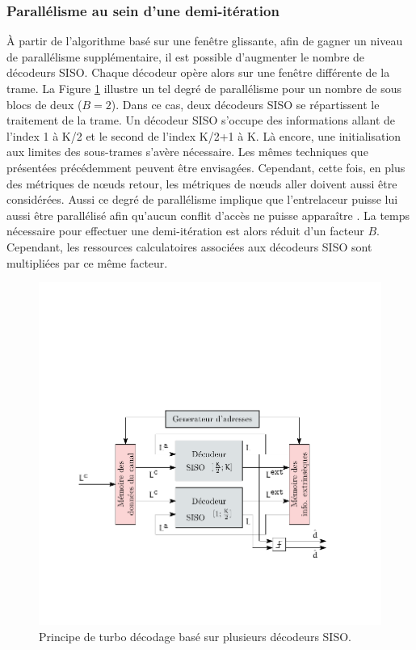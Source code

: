 \subsubsection{Parallélisme au sein d'une demi-itération}
À partir de l'algorithme basé sur une fenêtre glissante, afin de gagner un niveau de parallélisme supplémentaire, il est possible 
d'augmenter le nombre de décodeurs SISO. Chaque décodeur opère alors sur une fenêtre différente de la 
trame. La Figure \ref{fig:turbo_par} illustre un tel degré de parallélisme pour un nombre de sous blocs de deux ($B=2$).
Dans ce cas, deux décodeurs SISO se répartissent le traitement de la trame. Un décodeur SISO s'occupe des informations allant de l'index
1 à K/2 et le second de l'index K/2+1 à K. Là encore, une initialisation aux limites des sous-trames s'avère nécessaire. Les mêmes 
techniques que présentées précédemment peuvent être envisagées. Cependant, cette fois, en plus des métriques de nœuds
retour, les métriques de nœuds aller doivent aussi être considérées. Aussi ce degré de parallélisme implique que 
l'entrelaceur puisse lui aussi être parallélisé afin qu’aucun conflit d'accès ne puisse apparaître 
\cite{interleaver_conflict}. 
La temps nécessaire pour effectuer une demi-itération est alors réduit d'un facteur $B$. Cependant, les ressources 
calculatoires associées aux décodeurs SISO sont multipliées par ce même facteur.

\begin{figure}[!h]
	\centering
	\includegraphics{main/ch4_fig/ipe/parallel_2.pdf}
	\caption{Principe de turbo décodage basé  sur plusieurs décodeurs SISO. \label{fig:turbo_par}}
\end{figure} 

